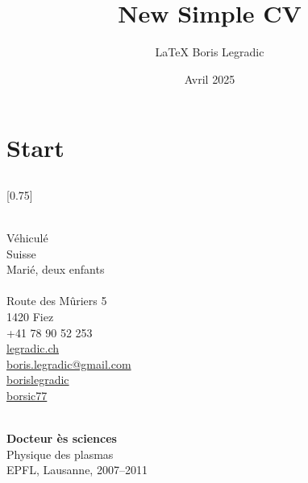 \documentclass[verylight]{simplehipstercv}
\title{New Simple CV}
\author{\LaTeX{} Boris Legradic}
\date{Avril 2025}
\begin{document}
\thispagestyle{empty}

\section*{Start}

\subsection*{}
\vspace{4em}

\setlength{\columnsep}{1.5cm}
[0.75]
\begin{paracol}{2}
\paracolbackgroundoptions

\footnotesize
{\setasidefontcolour
\flushright

\bigskip \bigskip
\begin{center}
\end{center}
\bigskip \bigskip

\\[0.5em]
Véhiculé\\
Suisse\\
Marié, deux enfants\\

\bigskip \bigskip
{}\\[0.5em]
Route des Mûriers 5\\
1420 Fiez\\
+41 78 90 52 253\\

\bigskip
\href{https://legradic.ch}{legradic.ch }\\
\href{mailto:boris.legradic@gmail.com}{boris.legradic@gmail.com }\\
\href{https://www.linkedin.com/in/borislegradic}{borislegradic }\\
\href{https://github.com/borsic77}{borsic77 }

\bigskip \bigskip
{}\\[0.5em]
\textbf{Docteur ès sciences}\\
Physique des plasmas\\
EPFL, Lausanne, 2007–2011\\[0.5em]

}
\end{paracol}
\end{document}
